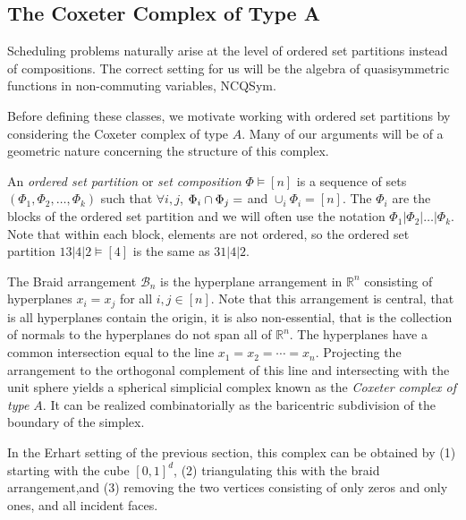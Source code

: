 \documentclass[12pt,reqno]{amsart}
\numberwithin{definition}{section}
\theoremstyle{definition}
\begin{document}
\subsection{The Coxeter Complex of Type A}
Scheduling problems naturally arise at the level of ordered set partitions instead of
compositions.  The correct setting for us will be the algebra of  
quasisymmetric functions in non-commuting variables, NCQSym.

Before defining these classes, we motivate working with ordered set
partitions by considering the Coxeter complex of type $A$.  Many of
our arguments will be of a geometric nature concerning the structure
of this complex.


An \emph{ordered set partition} or \emph{set composition} $\Phi \vDash
[n]$ is a sequence of sets $(\Phi_1, \Phi_2, \ldots, \Phi_k)$ such that $\forall
i,j$, $ \Phi_i \cap \Phi_j = \empty$ and $\cup_i \Phi_i = [n]$.  The $\Phi_i$ are the
blocks of the ordered set partition and we will often use the notation
$\Phi_1| \Phi_2| \ldots| \Phi_k$.  Note that within each block, elements are
not ordered, so the ordered set partition $13|4|2 \vDash [4]$ is the
same as $31|4|2$.



The Braid arrangement $\mathcal{B}_n$ is the hyperplane arrangement in
$\mathbb{R}^n$ consisting of hyperplanes $x_i = x_j$ for all $i,j \in [n]$.
Note that this arrangement is central, that is all hyperplanes contain
the origin, it is also non-essential, that is the collection of
normals to the hyperplanes do not span all of $\mathbb{R}^n$.  The
hyperplanes have a common intersection equal to the line $x_1 = x_2 = \cdots
= x_n$.  Projecting the arrangement to the orthogonal complement of
this line and intersecting with the unit sphere yields a spherical
simplicial complex known as the \emph{Coxeter complex of type $A$}.
It can be realized combinatorially as the baricentric subdivision of the
boundary of the simplex. 

 In the Erhart setting of the previous section, this complex
can be obtained by (1) starting with the cube $[0,1]^d$, (2) triangulating 
this with the braid arrangement,and (3) removing the two vertices consisting of 
only zeros and only ones, and all incident faces. 

\end{document}
